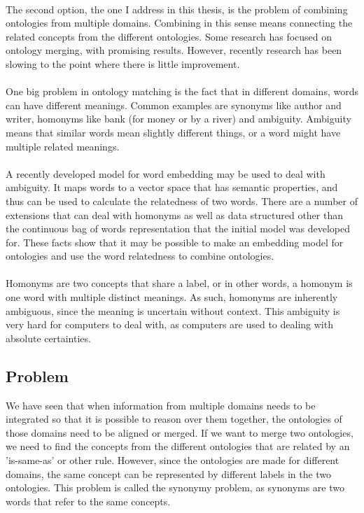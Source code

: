 \documentclass{article}
\begin{document}
 \paragraph{}
 The second option, the one I address in this thesis, is the problem of combining ontologies from multiple domains. Combining in this sense means connecting the related concepts from the different ontologies. Some research has focused on ontology merging, with promising results. However, recently research has been slowing to the point where there is little improvement.
 \paragraph{}
 One big problem in ontology matching is the fact that in different domains, words can have different meanings. Common examples are synonyms like author and writer, homonyms like bank (for money or by a river) and ambiguity. Ambiguity means that similar words mean slightly different things, or a word might have multiple related meanings.
 \paragraph{}
 A recently developed model for word embedding may be used to deal with ambiguity. It maps words to a vector space that has semantic properties, and thus can be used to calculate the relatedness of two words. There are a number of extensions that can deal with homonyms as well as data structured other than the continuous bag of words representation that the initial model was developed for. These facts show that it may be possible to make an embedding model for ontologies and use the word relatedness to combine ontologies\cite{multisense}.
 \paragraph{}
 Homonyms are two concepts that share a label, or in other words, a homonym is one word with multiple distinct meanings. As such, homonyms are inherently ambiguous, since the meaning is uncertain without context. This ambiguity is very hard for computers to deal with, as computers are used to dealing with absolute certainties.
  
 \subsection{Problem}
 We have seen that when information from multiple domains needs to be integrated so that it is possible to reason over them together, the ontologies of those domains need to be aligned or merged.
 If we want to merge two ontologies, we need to find the concepts from the different ontologies that are related by an 'is-same-as' or other rule.
 However, since the ontologies are made for different domains, the same concept can be represented by different labels in the two ontologies. This problem is called the synonymy problem, as synonyms are two words that refer to the same concepts.
\end{document}

